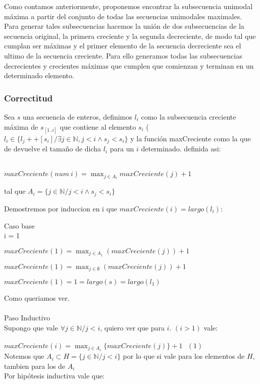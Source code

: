 Como contamos anteriormente, proponemos encontrar la subsecuencia unimodal máxima a partir del conjunto de todas las secuencias unimodales maximales. Para generar tales subsecuencias hacemos la unión de dos subsecuencias de la secuencia original, la primera creciente y la segunda decreciente, de modo tal que cumplan ser máximas y el primer elemento de la secuencia decreciente sea el ultimo de la secuencia creciente. Para ello generamos todas las subsecuencias decrecientes y crecientes máximas que cumplen que comienzan y terminan en un determinado elemento.

\subsubsection{Correctitud}
Sea $s$ una secuencia de enteros, definimos $l_i$ como la subsecuencia creciente máxima de $s_[1..i]$ que contiene al elemento $s_i$ ($l_i \in
  \{l_j ++ [s_i] / \exists j \in \mathbb{N}, j < i \land s_j < s_i\}$ y la función maxCreciente como la que de devuelve el tamaño de dicha $l_i$ para un $i$ determinado. definida asi:\\
\\
    \centerline{$ \displaystyle maxCreciente(num\ i) = \max_{j \in A_i} maxCreciente(j) + 1$} 
    \centerline{tal que $A_i = \{ j \in \mathbb{N} / j < i \land s_j < s_i \}$}

Demostremos por induccion en i que $maxCreciente(i) = largo(l_i)$:

Caso base\\
i = 1 \\
\centerline{$\displaystyle maxCreciente(1) = \max_{j \in A_1} (maxCreciente(j)) + 1$}
\centerline{$\displaystyle maxCreciente(1) = \max_{j \in \emptyset} (maxCreciente(j)) + 1$}
\centerline{$\displaystyle maxCreciente(1) = 1 = largo(s) = largo(l_1)$} 
Como queriamos ver.\\
\\
Paso Inductivo\\
Supongo que vale $\forall j \in \mathbb{N} / j < i$, quiero ver que para $i$. $(i > 1)$ vale:\\
\\
$\displaystyle maxCreciente(i) = \max_{j \in A_i} \{maxCreciente(j)\} + 1 \ \ \ (1)$\\

Notemos que $ A_i \subset H = \{ j \in \mathbb{N} / j < i\} $ por lo que si vale para los elementos de $H$, tambien para los de $A_i$\\
Por hipótesis inductiva vale que:\\

